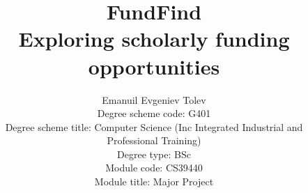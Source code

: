 
\title{FundFind \\
Exploring scholarly funding opportunities\\
}

\author{Emanuil Evgeniev Tolev\\
Degree scheme code: G401\\
Degree scheme title: Computer Science (Inc Integrated Industrial and Professional Training)\\
Degree type: BSc\\
Module code: CS39440\\
Module title: Major Project}








\maketitle



